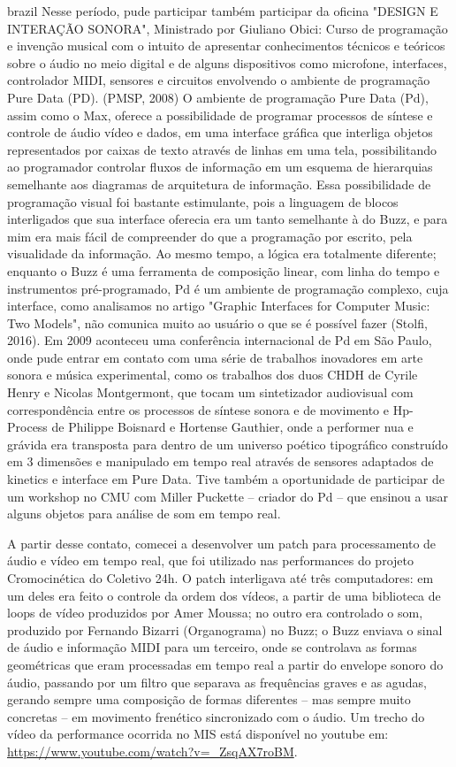 \begin{otherlanguage*}{brazil}
Nesse período, pude participar também participar da oficina  "DESIGN E INTERAÇÃO SONORA", Ministrado por Giuliano Obici:
Curso de programação e invenção musical com o intuito de apresentar conhecimentos técnicos e teóricos sobre o áudio no meio digital e de alguns dispositivos como microfone, interfaces, controlador MIDI, sensores e circuitos envolvendo o ambiente de programação Pure Data (PD). (PMSP, 2008)
O ambiente de programação Pure Data (Pd), assim como o Max, oferece a possibilidade de programar processos de síntese e controle de áudio vídeo e dados, em uma interface gráfica que interliga objetos representados por caixas de texto através de linhas em uma tela, possibilitando ao programador controlar fluxos de informação em um esquema de hierarquias semelhante aos diagramas de arquitetura de informação. Essa possibilidade de programação visual foi bastante estimulante, pois a linguagem de blocos interligados que sua interface oferecia era um tanto semelhante à do Buzz, e para mim era mais fácil de compreender do que a programação por escrito, pela visualidade da informação. Ao mesmo tempo, a lógica era totalmente diferente; enquanto o Buzz é uma ferramenta de composição linear, com linha do tempo e instrumentos pré-programado, Pd é um ambiente de programação complexo, cuja interface, como analisamos no artigo "Graphic Interfaces for Computer Music: Two Models", não comunica muito ao usuário o que se é possível fazer (Stolfi, 2016). 
Em 2009 aconteceu uma conferência internacional de Pd em São Paulo, onde pude entrar em contato com uma série de trabalhos inovadores em arte sonora e música experimental, como os trabalhos dos duos CHDH de Cyrile Henry e Nicolas Montgermont, que tocam um sintetizador audiovisual com correspondência entre os processos de síntese sonora e de movimento e Hp-Process de Philippe Boisnard e Hortense Gauthier, onde a performer nua e grávida era transposta para dentro de um universo poético tipográfico construído em 3 dimensões e manipulado em tempo real através de sensores adaptados de kinetics e interface em Pure Data. Tive também a oportunidade de participar de um workshop no CMU com Miller Puckette – criador do Pd – que ensinou a usar alguns objetos para análise de som em tempo real.

A partir desse contato, comecei a desenvolver um patch para processamento de áudio e vídeo em tempo real, que foi utilizado nas performances do projeto Cromocinética do Coletivo 24h. O patch interligava até três computadores: em um deles era feito o controle da ordem dos vídeos, a partir de uma biblioteca de loops de vídeo produzidos por Amer Moussa; no outro era controlado o som, produzido por Fernando Bizarri (Organograma) no Buzz; o Buzz enviava o sinal de áudio e informação MIDI para um terceiro, onde se controlava as formas geométricas que eram processadas em tempo real a partir do envelope sonoro do áudio, passando por um filtro que separava as frequências graves e as agudas, gerando sempre uma composição de formas diferentes – mas sempre muito concretas – em movimento frenético sincronizado com o áudio. Um trecho do vídeo da performance ocorrida no MIS está disponível no youtube em:  \url{https://www.youtube.com/watch?v=_ZsqAX7roBM}.


\end{otherlanguage*}
